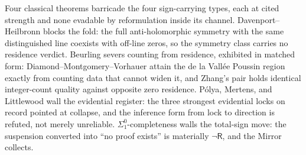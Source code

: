 \documentclass[twocolumn,10pt]{article}
\theoremstyle{plain}
\theoremstyle{definition}
\newcommand{\R}{\mathsf{R}}
\begin{document}
Four classical theorems barricade the four sign-carrying types, each at cited strength and none evadable by reformulation inside its channel. Davenport--Heilbronn blocks the fold: the full anti-holomorphic symmetry with the same distinguished line coexists with off-line zeros, so the symmetry class carries no residence verdict. Beurling severs counting from residence, exhibited in matched form: Diamond--Montgomery--Vorhauer attain the de la Vall\'ee Poussin region exactly from counting data that cannot widen it, and Zhang's pair holds identical integer-count quality against opposite zero residence. P\'olya, Mertens, and Littlewood wall the evidential register: the three strongest evidential locks on record pointed at collapse, and the inference form from lock to direction is refuted, not merely unreliable. $\Sigma^0_1$-completeness walls the total-sign move: the suspension converted into ``no proof exists'' is materially $\neg\R$, and the Mirror collects.
\end{document}
